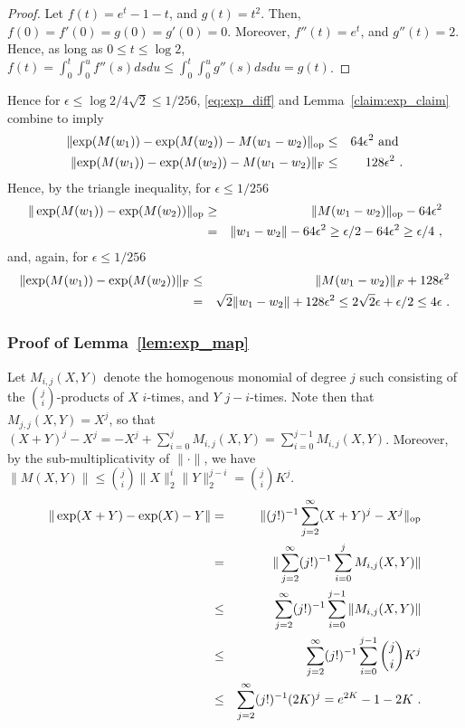 	\begin{proof}
	Let $f(t) = e^t -1 - t$, and $g(t) = t^2$. Then, $f(0) = f'(0) = g(0) = g'(0) = 0$. Moreover, $f''(t) = e^{t}$, and $g''(t) = 2$. Hence, as long as $0 \le t \le \log 2$, $f(t) = \int_{0}^t \int_{0}^u f''(s)dsdu \le \int_{0}^t \int_{0}^u g''(s)dsdu = g(t)$.
	\end{proof}
	Hence for $\epsilon \le \log 2/4\sqrt{2} \le 1/256$, \eqref{eq:exp_diff} and Lemma~\ref{claim:exp_claim} combine to imply
	\begin{eqnarray*}
	\lVert \exp(M(w_1))-\exp(M(w_2)) - M(w_1 - w_2) \rVert_{\mathrm{op}} &\le& 64\epsilon^2 \text{ and } \\
	\lVert \exp(M(w_1))-\exp(M(w_2)) - M(w_1 - w_2) \rVert_{\mathrm{F}} &\le& 128\epsilon^2~.
	\end{eqnarray*}
	Hence, by the triangle inequality, for $\epsilon \le 1/256$
	\begin{eqnarray*}
	\|\exp(M(w_1))-\exp(M(w_2))\|_{\mathrm{op}} &\ge& \|M(w_1 - w_2)\|_{\mathrm{op}} - 64\epsilon^2 \\
	&=& \|w_1 - w_2\| - 64\epsilon^2  \ge \epsilon/2 - 64\epsilon^2 \ge \epsilon/4~,
	\end{eqnarray*}
	and, again, for $\epsilon \le 1/256$
	\begin{eqnarray*}
	\lVert \exp(M(w_1))-\exp(M(w_2)) \rVert_{\mathrm{F}} &\le& \|M(w_1 - w_2)\|_{F} + 128\epsilon^2 \\
	&=& \sqrt{2}\|w_1 - w_2\| + 128\epsilon^2 \le 2\sqrt{2}\epsilon + \epsilon/2 \le 4\epsilon~.
	\end{eqnarray*}



\subsubsection{Proof of Lemma~\ref{lem:exp_map}\label{sec:exp_map_proof}}

	Let $M_{i,j}(X,Y)$ denote the homogenous monomial of degree $j$ such consisting of the $\binom{j}{i}$-products of $X$ $i$-times, and $Y$ $j-i$-times. Note then that $M_{j,j}(X,Y) = X^j$, so that $(X+Y)^{j}-X^j = -X^j + \sum_{i=0}^j M_{i,j}(X,Y) = \sum_{i=0}^{j-1} M_{i,j}(X,Y)$. Moreover, by the sub-multiplicativity of $\|\cdot\|$, we have $\|M(X,Y)\| \le \binom{j}{i}\|X\|_2^{i}\|Y\|_2^{j-i} = \binom{j}{i}K^j$.
	\begin{eqnarray*}
	\|\exp(X + Y) - \exp(X) - Y\| &=&  \|(j!)^{-1}\sum_{j=2}^{\infty} (X+Y)^{j}-X^j\|_{\mathrm{op}}\\
	&=& \|\sum_{j=2}^{\infty}(j!)^{-1}\sum_{i=0}^{j} M_{i,j}(X,Y) \| \\
	&\le& \sum_{j=2}^{\infty} (j!)^{-1}\sum_{i=0}^{j-1} \|M_{i,j}(X,Y) \| \\
	&\le& \sum_{j=2}^{\infty} (j!)^{-1}\sum_{i=0}^{j-1}  \binom{j}{i}K^j\\
	&\le& \sum_{j=2}^{\infty} (j!)^{-1}(2K)^j = e^{2K} - 1 - 2K~.
	\end{eqnarray*}

